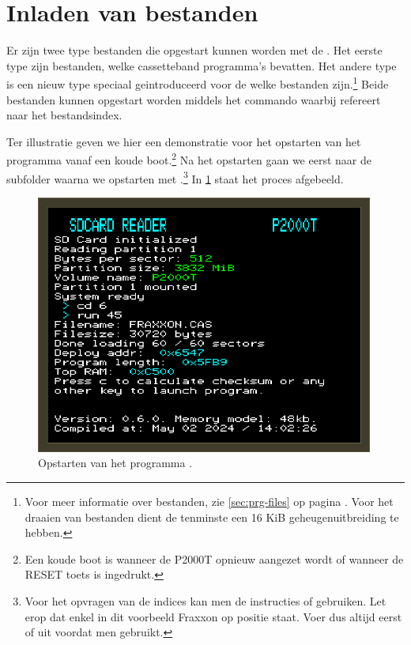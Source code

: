 %
%
%
\section{Inladen van bestanden}
\label{sec:loading}


Er zijn twee type bestanden die opgestart kunnen worden met de \product. Het eerste type zijn \cas bestanden, welke cassetteband programma's bevatten. Het andere type is een nieuw type speciaal geintroduceerd voor de \product welke \prg bestanden zijn.\footnote{Voor meer informatie over \prg bestanden, zie \cref{sec:prg-files} op pagina \pageref{sec:prg-files}. Voor het draaien van \prg bestanden dient de  tenminste een 16 KiB geheugenuitbreiding te hebben.} Beide bestanden kunnen opgestart worden middels het  commando waarbij  refereert naar het bestandsindex.

Ter illustratie geven we hier een demonstratie voor het opstarten van het programma  vanaf een koude boot.\footnote{Een koude boot is wanneer de P2000T opnieuw aangezet wordt of wanneer de RESET toets is ingedrukt.} Na het opstarten gaan we eerst naar de subfolder  waarna we  opstarten met .\footnote{Voor het opvragen van de indices kan men de instructies  of  gebruiken. Let erop dat enkel in dit voorbeeld Fraxxon op positie  staat. Voer dus altijd eerst  of  uit voordat men  gebruikt.} In \cref{fig:screenshot-run-fraxon} staat het proces afgebeeld.

\begin{figure}[h!]
    \centering
    \includegraphics[width=0.99\textwidth]{img/run-fraxxon.png}
    \caption{Opstarten van het programma .}
    \label{fig:screenshot-run-fraxon}
\end{figure}


